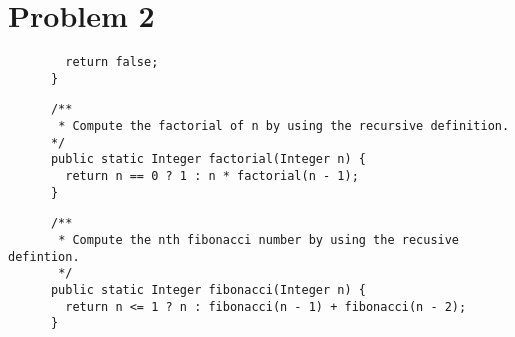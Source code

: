 \documentclass{article}
\newenvironment{problem}[1]{
  \nobreak\section*{Problem #1}
}{}
\begin{document}
\begin{problem}{2}
\begin{lstlisting}
        return false;
      }
    \end{lstlisting}

    \begin{lstlisting}
      /**
       * Compute the factorial of n by using the recursive definition.
      */
      public static Integer factorial(Integer n) {
        return n == 0 ? 1 : n * factorial(n - 1);
      }
    \end{lstlisting}

    \begin{lstlisting}
      /**
       * Compute the nth fibonacci number by using the recusive defintion.
       */
      public static Integer fibonacci(Integer n) {
        return n <= 1 ? n : fibonacci(n - 1) + fibonacci(n - 2);
      }
    \end{lstlisting}
  \end{problem}
\end{document}
